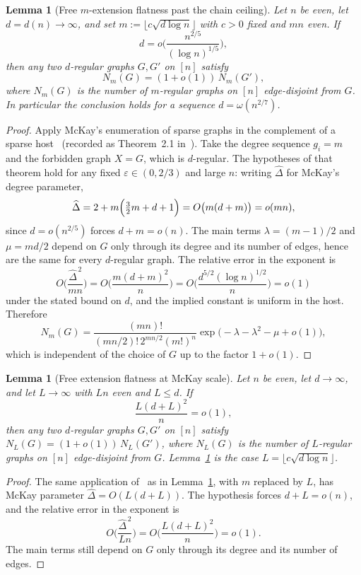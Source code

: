 \documentclass[11pt]{article}
\newtheorem{lemma}[theorem]{Lemma}
\begin{document}
\begin{lemma}[Free \(m\)-extension flatness past the chain ceiling]
\label{lem:free-flat}
Let \(n\) be even, let \(d=d(n)\to\infty\), and set
\(m:=\lfloor c\sqrt{d\log n}\rfloor\) with \(c>0\) fixed and \(mn\) even.
If
\[
d=o\Biggl(\frac{n^{2/5}}{(\log n)^{1/5}}\Biggr),
\]
then any two \(d\)-regular graphs \(G,G'\) on \([n]\) satisfy
\[
N_m(G)=(1+o(1))\,N_m(G'),
\]
where \(N_m(G)\) is the number of \(m\)-regular graphs on \([n]\) edge-disjoint from \(G\).
In particular the conclusion holds for a sequence \(d=\omega(n^{2/7})\).
\end{lemma}

\begin{proof}
Apply McKay's enumeration of sparse graphs in the complement of a sparse
host~\cite[Theorem~4.6]{McK85} (recorded as Theorem~2.1 in~\cite{HLMPW25}).
Take the degree sequence \(g_i=m\) and the forbidden graph \(X=G\), which is
\(d\)-regular.
The hypotheses of that theorem hold for any fixed \(\varepsilon\in(0,2/3)\) and large
\(n\): writing \(\widehat\Delta\) for McKay's degree parameter,
\[
\widehat\Delta
=2+m\Bigl(\tfrac32 m+d+1\Bigr)
=O\bigl(m(d+m)\bigr)
=o(mn),
\]
since \(d=o(n^{2/5})\) forces \(d+m=o(n)\).
The main terms \(\lambda=(m-1)/2\) and
\(\mu=md/2\) depend on \(G\) only through its degree and its number of edges, hence
are the same for every \(d\)-regular graph.
The relative error in the exponent is
\[
O\Biggl(\frac{\widehat\Delta^{\,2}}{mn}\Biggr)
=O\Biggl(\frac{m(d+m)^2}{n}\Biggr)
=O\Biggl(\frac{d^{5/2}(\log n)^{1/2}}{n}\Biggr)
=o(1)
\]
under the stated bound on \(d\), and the implied constant is uniform in the host.
Therefore
\[
N_m(G)
=
\frac{(mn)!}{(mn/2)!\,2^{mn/2}(m!)^n}
\exp\bigl(-\lambda-\lambda^2-\mu+o(1)\bigr),
\]
which is independent of the choice of \(G\) up to the factor \(1+o(1)\).
\end{proof}

\begin{lemma}[Free extension flatness at McKay scale]
\label{lem:free-flat-L}
Let \(n\) be even, let \(d\to\infty\), and let \(L\to\infty\) with \(Ln\) even and \(L\le d\).
If
\[
\frac{L(d+L)^2}{n}=o(1),
\]
then any two \(d\)-regular graphs \(G,G'\) on \([n]\) satisfy \(N_L(G)=(1+o(1))\,N_L(G')\), where \(N_L(G)\) is the number of \(L\)-regular graphs on \([n]\) edge-disjoint from \(G\).
Lemma~\ref{lem:free-flat} is the case \(L=\lfloor c\sqrt{d\log n}\rfloor\).
\end{lemma}

\begin{proof}
The same application of~\cite[Theorem~4.6]{McK85} as in Lemma~\ref{lem:free-flat}, with \(m\) replaced by \(L\), has McKay parameter \(\widehat\Delta=O(L(d+L))\).
The hypothesis forces \(d+L=o(n)\), and the relative error in the exponent is
\[
O\Biggl(\frac{\widehat\Delta^{\,2}}{Ln}\Biggr)
=
O\Biggl(\frac{L(d+L)^2}{n}\Biggr)
=
o(1).
\]
The main terms still depend on \(G\) only through its degree and its number of edges.
\end{proof}
\end{document}
